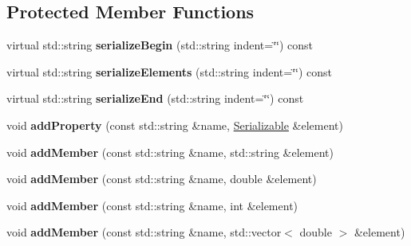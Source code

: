 \subsection*{Protected Member Functions}
\begin{DoxyCompactItemize}
\item 
\hypertarget{classg2c_1_1_serializable_af236d2bc1a3dadeee2f5723b4d20ee56}{
virtual std::string {\bfseries serializeBegin} (std::string indent=\char`\"{}\char`\"{}) const }
\label{classg2c_1_1_serializable_af236d2bc1a3dadeee2f5723b4d20ee56}

\item 
\hypertarget{classg2c_1_1_serializable_a53404296d3efe29a8b8b2e6f09e6fbf2}{
virtual std::string {\bfseries serializeElements} (std::string indent=\char`\"{}\char`\"{}) const }
\label{classg2c_1_1_serializable_a53404296d3efe29a8b8b2e6f09e6fbf2}

\item 
\hypertarget{classg2c_1_1_serializable_a20356e175519cdc58b2b81b4135c3385}{
virtual std::string {\bfseries serializeEnd} (std::string indent=\char`\"{}\char`\"{}) const }
\label{classg2c_1_1_serializable_a20356e175519cdc58b2b81b4135c3385}

\item 
\hypertarget{classg2c_1_1_serializable_a1ebd03176b676b7405a37134de7ccfef}{
void {\bfseries addProperty} (const std::string \&name, \hyperlink{classg2c_1_1_serializable}{Serializable} \&element)}
\label{classg2c_1_1_serializable_a1ebd03176b676b7405a37134de7ccfef}

\item 
\hypertarget{classg2c_1_1_serializable_abf5406405e2f51bbff5ac1805e545190}{
void {\bfseries addMember} (const std::string \&name, std::string \&element)}
\label{classg2c_1_1_serializable_abf5406405e2f51bbff5ac1805e545190}

\item 
\hypertarget{classg2c_1_1_serializable_a8af126034d19c9d74f78be17e6bf13f1}{
void {\bfseries addMember} (const std::string \&name, double \&element)}
\label{classg2c_1_1_serializable_a8af126034d19c9d74f78be17e6bf13f1}

\item 
\hypertarget{classg2c_1_1_serializable_a3a0b8ba26cd07e91222335e77aefe15f}{
void {\bfseries addMember} (const std::string \&name, int \&element)}
\label{classg2c_1_1_serializable_a3a0b8ba26cd07e91222335e77aefe15f}

\item 
\hypertarget{classg2c_1_1_serializable_a2a1c97b1f4b6d939f4d7b044d47922f4}{
void {\bfseries addMember} (const std::string \&name, std::vector$<$ double $>$ \&element)}
\label{classg2c_1_1_serializable_a2a1c97b1f4b6d939f4d7b044d47922f4}


\end{DoxyCompactItemize}
